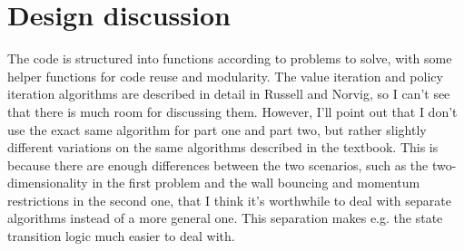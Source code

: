 \documentclass[letterpaper, 10pt]{article}
\begin{document}
\section{Design discussion}
The code is structured into functions according to problems to solve, with some helper functions for code reuse and modularity. 
The value iteration and policy iteration algorithms are described in detail in Russell and Norvig, so I can't see that there is much room for discussing them. 
However, I'll point out that I don't use the exact same algorithm for part one and part two, but rather slightly different variations on the same algorithms described in the textbook. 
This is because there are enough differences between the two scenarios, such as the two-dimensionality in the first problem and the wall bouncing and momentum restrictions in the second one, that I think it's worthwhile to deal with separate algorithms instead of a more general one.
This separation makes e.g. the state transition logic much easier to deal with. 

\end{document}
